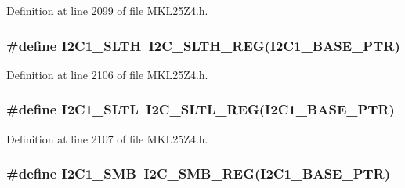 Definition at line 2099 of file M\+K\+L25\+Z4.\+h.

\subsubsection[{\texorpdfstring{I2\+C1\+\_\+\+S\+L\+TH}{I2C1_SLTH}}]{\setlength{\rightskip}{0pt plus 5cm}\#define I2\+C1\+\_\+\+S\+L\+TH~{\bf I2\+C\+\_\+\+S\+L\+T\+H\+\_\+\+R\+EG}({\bf I2\+C1\+\_\+\+B\+A\+S\+E\+\_\+\+P\+TR})}\hypertarget{group___i2_c___register___accessor___macros_ga636aa70cc9b9d94328cecb67e0005e7b}{}\label{group___i2_c___register___accessor___macros_ga636aa70cc9b9d94328cecb67e0005e7b}


Definition at line 2106 of file M\+K\+L25\+Z4.\+h.

\subsubsection[{\texorpdfstring{I2\+C1\+\_\+\+S\+L\+TL}{I2C1_SLTL}}]{\setlength{\rightskip}{0pt plus 5cm}\#define I2\+C1\+\_\+\+S\+L\+TL~{\bf I2\+C\+\_\+\+S\+L\+T\+L\+\_\+\+R\+EG}({\bf I2\+C1\+\_\+\+B\+A\+S\+E\+\_\+\+P\+TR})}\hypertarget{group___i2_c___register___accessor___macros_ga1d6d67136378cdc43250d350dde35366}{}\label{group___i2_c___register___accessor___macros_ga1d6d67136378cdc43250d350dde35366}


Definition at line 2107 of file M\+K\+L25\+Z4.\+h.

\subsubsection[{\texorpdfstring{I2\+C1\+\_\+\+S\+MB}{I2C1_SMB}}]{\setlength{\rightskip}{0pt plus 5cm}\#define I2\+C1\+\_\+\+S\+MB~{\bf I2\+C\+\_\+\+S\+M\+B\+\_\+\+R\+EG}({\bf I2\+C1\+\_\+\+B\+A\+S\+E\+\_\+\+P\+TR})}\hypertarget{group___i2_c___register___accessor___macros_gaa9377a6d31b5c6a841b69330a6e8d59d}{}\label{group___i2_c___register___accessor___macros_gaa9377a6d31b5c6a841b69330a6e8d59d}


